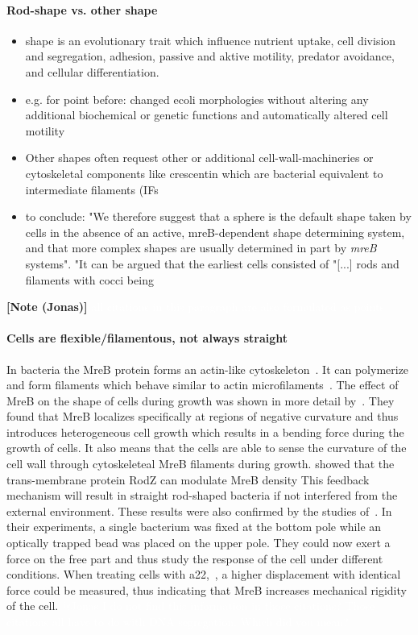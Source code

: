 \documentclass{article}
\newcommand{\todo}[1]{\colorbox{WildStrawberry}{\textcolor{white}{#1}}}
\begin{document}
\paragraph{Rod-shape vs. other shape}
\begin{itemize}
    \item \cite{Young2006} shape is an evolutionary trait which influence nutrient uptake, cell division and segregation, adhesion, passive and aktive motility, predator avoidance, and cellular differentiation.
    \item e.g. for point before: \cite{Takeuchi2005} changed \ac{ecoli} morphologies without altering any additional biochemical or genetic functions and automatically altered cell motility
    \item Other shapes often request other or additional cell-wall-machineries \cite{Zapun2008} or cytoskeletal components like crescentin which are bacterial equivalent to intermediate filaments (IFs\cite{Ausmees2003}
    \item to conclude: \cite{Jones2001} "We therefore suggest that a sphere is the default shape taken by cells in the absence of an active, mreB-dependent shape determining system, and that more complex shapes are usually determined in part by \textit{mreB} systems". \cite{Young2006} "It can be argued that the earliest cells consisted of "[...] rods and filaments with cocci being
\end{itemize}


\textbf{[Note (Jonas)]} \todo{all citations in this paragraph are also formulated as points}
\paragraph{Cells are flexible/filamentous, not always straight} 
In bacteria the MreB protein forms an actin-like cytoskeleton~\cite{Erickson2001}.
It can polymerize and form filaments which behave similar to actin microfilaments~\cite{Dersch2020}.
The effect of MreB on the shape of cells during growth was shown in more detail
by~\cite{Ursell2014}.
They found that MreB localizes specifically at regions of negative curvature and thus introduces
heterogeneous cell growth which results in a bending force during the growth of cells.
It also means that the cells are able to sense the curvature of the cell wall through cytoskeleteal
MreB filaments during growth.
\cite{Bratton2018} showed that the trans-membrane protein RodZ can modulate MreB density
This feedback mechanism will result in straight rod-shaped bacteria if not interfered from the
external environment.
These results were also confirmed by the studies of~\cite{Wang2010}.
In their experiments, a single bacterium was fixed at the bottom pole while an optically trapped
bead was placed on the upper pole.
They could now exert a force on the free part and thus study the response of the cell under
different conditions.
When treating cells with \ac{a22},~\cite{IWAI2002,Gitai2005,Karczmarek2007,Bean2009}, a higher displacement with identical force could be measured, thus indicating that MreB increases mechanical rigidity of the cell. \todo{@Jonas I do not find this information in those citations? Those citations all have to do with DNA segregation. Which did you mean?}
\end{document}
